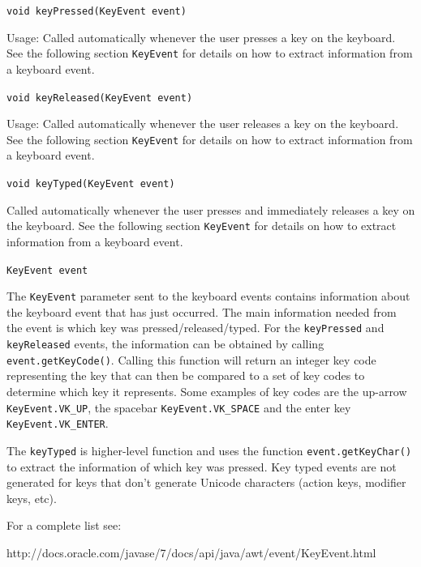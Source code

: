 \documentclass[a4paper, 10pt]{report}
\begin{document}
\hrulefill

{\large {\tt void keyPressed(KeyEvent event)}}

Usage: Called automatically whenever the user presses a key on the keyboard. See the following section {\tt KeyEvent} for details on how to extract information from a keyboard event.

\hrulefill

{\large {\tt void keyReleased(KeyEvent event)}}

Usage: Called automatically whenever the user releases a key on the keyboard. See the following section {\tt KeyEvent} for details on how to extract information from a keyboard event.	

\hrulefill

{\large {\tt void keyTyped(KeyEvent event)}}

Called automatically whenever the user presses and immediately releases a key on the keyboard. See the following section {\tt KeyEvent} for details on how to extract information from a keyboard event.

\hrulefill

{\large {\tt KeyEvent event}}

The {\tt KeyEvent} parameter sent to the keyboard events contains information about the keyboard event that has just occurred. The main information needed from the event is which key was pressed/released/typed. For the {\tt keyPressed} and {\tt keyReleased} events, the information can be obtained by calling {\tt event.getKeyCode()}. Calling this function will return an integer key code representing the key that can then be compared to a set of key codes to determine which key it represents. Some examples of key codes are the up-arrow {\tt KeyEvent.VK\_UP}, the spacebar {\tt KeyEvent.VK\_SPACE} and the enter key {\tt KeyEvent.VK\_ENTER}.

The {\tt keyTyped} is higher-level function and uses the function {\tt event.getKeyChar()} to extract the information of which key was pressed. Key typed events are not generated for keys that don't generate Unicode characters (action keys, modifier keys, etc).

For a complete list see:

http://docs.oracle.com/javase/7/docs/api/java/awt/event/KeyEvent.html

\hrulefill

\end{document}
